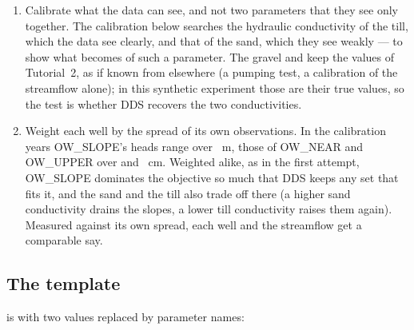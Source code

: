 \begin{enumerate}
\item Calibrate what the data can see, and not two parameters that they see only together. The calibration below searches
      the hydraulic conductivity of the till, which the data see clearly, and that of the sand, which they see weakly ---
      to show what becomes of such a parameter. The gravel and  keep the values of
      Tutorial~2, as if known from elsewhere (a pumping test, a calibration of the streamflow alone); in this synthetic
      experiment those are their true values, so the test is whether DDS recovers the two conductivities.
\item Weight each well by the spread of its own observations. In the calibration years OW\_SLOPE's heads range over
      ~m, those of OW\_NEAR and OW\_UPPER over  and ~cm. Weighted alike, as in the first attempt, OW\_SLOPE dominates the objective so much
      that DDS keeps any set that fits it, and the sand and the till also trade off there (a higher sand conductivity drains
      the slopes, a lower till conductivity raises them again). Measured against its own spread, each well and the
      streamflow get a comparable say.
\end{enumerate}

\subsection{The template}
 is  with two values replaced by parameter names:


